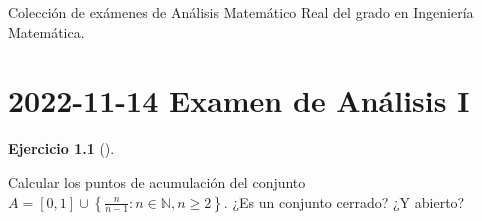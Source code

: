 \documentclass[
  a4paper,
]{scrreport}
\theoremstyle{definition}
\newtheorem{exercise}{Ejercicio}[chapter]
\theoremstyle{remark}
\begin{document}

Colección de exámenes de Análisis Matemático Real del grado en
Ingeniería Matemática.


\chapter{\texorpdfstring{2022-11-14 Examen de Análisis
I}{2022-11-14  Examen de Análisis I}}\label{examen-de-anuxe1lisis-i}

\begin{exercise}[]\protect\hypertarget{exr-1}{}\label{exr-1}

Calcular los puntos de acumulación del conjunto
\(A=[0,1]\cup \left\{\frac{n}{n-1}: n\in\mathbb{N}, n\geq 2\right\}\).
¿Es un conjunto cerrado? ¿Y abierto?

\end{exercise}
\end{document}
